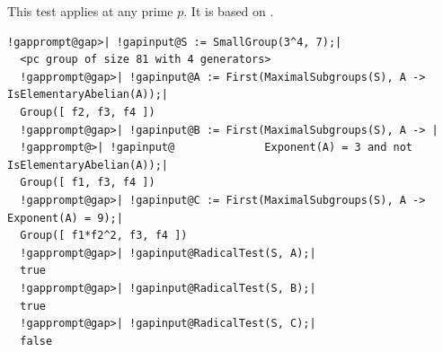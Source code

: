 \documentclass[a4paper,11pt]{report}
\begin{document}
{{{ This test applies at any prime $p$. It is based on \cite[Proposition 4.8(2)]{PS_MAGMA}. 

 }

 
\begin{Verbatim}[commandchars=!@|,fontsize=\small,frame=single,label=Example]
  !gapprompt@gap>| !gapinput@S := SmallGroup(3^4, 7);|
  <pc group of size 81 with 4 generators>
  !gapprompt@gap>| !gapinput@A := First(MaximalSubgroups(S), A -> IsElementaryAbelian(A));|
  Group([ f2, f3, f4 ])
  !gapprompt@gap>| !gapinput@B := First(MaximalSubgroups(S), A -> |
  !gapprompt@>| !gapinput@              Exponent(A) = 3 and not IsElementaryAbelian(A));|
  Group([ f1, f3, f4 ])
  !gapprompt@gap>| !gapinput@C := First(MaximalSubgroups(S), A -> Exponent(A) = 9);|
  Group([ f1*f2^2, f3, f4 ])
  !gapprompt@gap>| !gapinput@RadicalTest(S, A);|
  true
  !gapprompt@gap>| !gapinput@RadicalTest(S, B);|
  true
  !gapprompt@gap>| !gapinput@RadicalTest(S, C);|
  false
\end{Verbatim}
 }

 }

   
\end{document}
